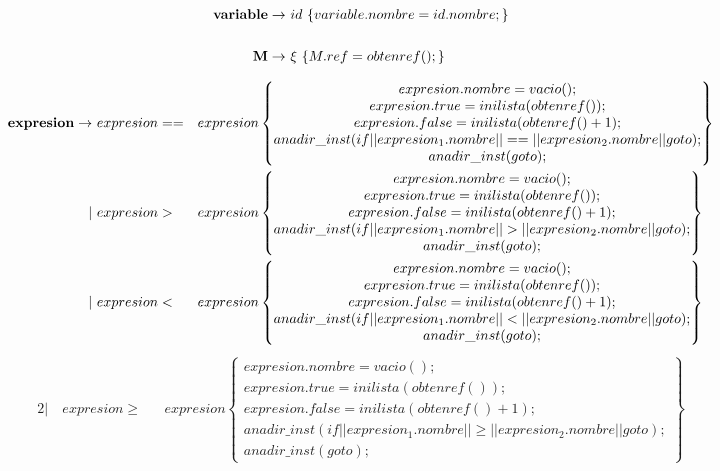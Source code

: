 \documentclass[12pt,a4paper, landscape]{article}
\theoremstyle{mytheor}
\begin{document}
\begin{center}
  \begin{alignat*}{2}
     \text{\textbf{variable}} \to\ & id\ \{variable.nombre = id.nombre;\} \\\\
     \text{\textbf{M}} \to\ &\xi\ \{M.ref=obtenref();\}
  \end{alignat*}
\end{center}

\begin{center}
  \begin{alignat*}{2}
     \text{\textbf{expresion}} \to\ &  expresion == && expresion \begin{Bmatrix} expresion.nombre = vacio();\\ expresion.true=inilista(obtenref()); \\  expresion.false=inilista(obtenref()+1);\\ anadir\_inst(if||expresion_1.nombre||==||expresion_2.nombre||goto);\\ anadir\_inst(goto);\end{Bmatrix} \\
    |\ & expresion > && expresion                \begin{Bmatrix} expresion.nombre = vacio();\\ expresion.true=inilista(obtenref()); \\  expresion.false=inilista(obtenref()+1);\\ anadir\_inst(if||expresion_1.nombre||>||expresion_2.nombre||goto);\\ anadir\_inst(goto);\end{Bmatrix} \\
    |\ & expresion < && expresion                   \begin{Bmatrix} expresion.nombre = vacio();\\ expresion.true=inilista(obtenref()); \\  expresion.false=inilista(obtenref()+1);\\ anadir\_inst(if||expresion_1.nombre||<||expresion_2.nombre||goto);\\ anadir\_inst(goto);\end{Bmatrix} \\
  \end{alignat*}
  \begin{alignat*}{2}
    |\ & expresion \geq && expresion                \begin{Bmatrix} expresion.nombre = vacio();\\ expresion.true=inilista(obtenref()); \\  expresion.false=inilista(obtenref()+1);\\ anadir\_inst(if||expresion_1.nombre||\geq||expresion_2.nombre||goto);\\ anadir\_inst(goto);\end{Bmatrix} \\

\end{alignat*}
\end{center}
\end{document}

